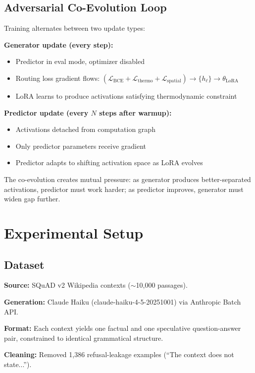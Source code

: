 \documentclass[11pt,a4paper]{article}
\begin{document}
\subsection{Adversarial Co-Evolution Loop}

Training alternates between two update types:

\textbf{Generator update (every step):}
\begin{itemize}
\item Predictor in eval mode, optimizer disabled
\item Routing loss gradient flows: $(\mathcal{L}_\text{BCE} + \mathcal{L}_\text{thermo} + \mathcal{L}_\text{spatial}) \rightarrow \{h_\ell\} \rightarrow \theta_\text{LoRA}$
\item LoRA learns to produce activations satisfying thermodynamic constraint
\end{itemize}

\textbf{Predictor update (every $N$ steps after warmup):}
\begin{itemize}
\item Activations detached from computation graph
\item Only predictor parameters receive gradient
\item Predictor adapts to shifting activation space as LoRA evolves
\end{itemize}

The co-evolution creates mutual pressure: as generator produces better-separated activations, predictor must work harder; as predictor improves, generator must widen gap further.

\section{Experimental Setup}

\subsection{Dataset}

\textbf{Source:} SQuAD v2 \citep{rajpurkar2018know} Wikipedia contexts ($\sim$10,000 passages).

\textbf{Generation:} Claude Haiku (claude-haiku-4-5-20251001) via Anthropic Batch API.

\textbf{Format:} Each context yields one factual and one speculative question-answer pair, constrained to identical grammatical structure.

\textbf{Cleaning:} Removed 1,386 refusal-leakage examples (``The context does not state...'').
\end{document}
